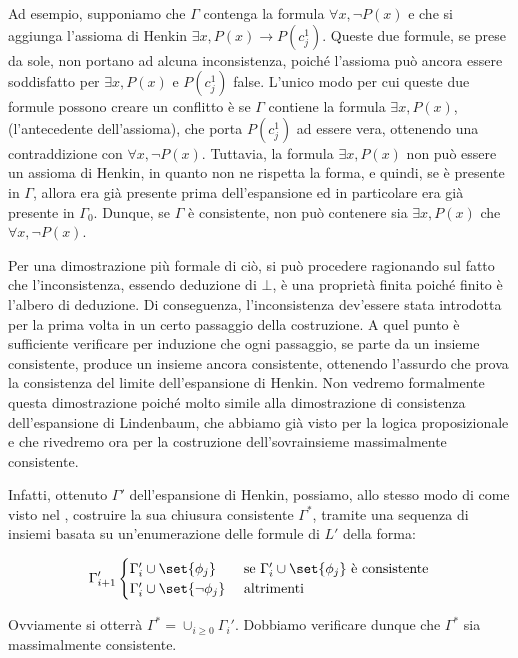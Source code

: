 Ad esempio, supponiamo che \(\Gamma\) contenga la formula \(\forall x, \neg P(x)\) e che si aggiunga l'assioma di Henkin \(\exists x, P(x) \to P(c_j^1)\). Queste due formule, se prese da sole, non portano ad alcuna inconsistenza, poiché l'assioma può ancora essere soddisfatto per \(\exists x, P(x)\) e \(P(c_j^1)\) false. L'unico modo per cui queste due formule possono creare un conflitto è se \(\Gamma\) contiene la formula \(\exists x, P(x)\), (l'antecedente dell'assioma), che porta \(P(c_j^1)\) ad essere vera, ottenendo una contraddizione con \(\forall x, \neg P(x)\).
Tuttavia, la formula \(\exists x, P(x)\) non può essere un assioma di Henkin, in quanto non ne rispetta la forma, e quindi, se è presente in \(\Gamma\), allora era già presente prima dell'espansione ed in particolare era già presente in \(\Gamma_0\). Dunque, se \(\Gamma\) è consistente, non può contenere sia \(\exists x, P(x)\) che \(\forall x, \neg P(x)\).

Per una dimostrazione più formale di ciò, si può procedere ragionando sul fatto che l'inconsistenza, essendo deduzione di \(\bot\), è una proprietà finita poiché finito è l'albero di deduzione. Di conseguenza, l'inconsistenza dev'essere stata introdotta per la prima volta in un certo passaggio della costruzione. A quel punto è sufficiente verificare per induzione che ogni passaggio, se parte da un insieme consistente, produce un insieme ancora consistente, ottenendo l'assurdo che prova la consistenza del limite dell'espansione di Henkin. Non vedremo formalmente questa dimostrazione poiché molto simile alla dimostrazione di consistenza dell'espansione di Lindenbaum, che abbiamo già visto per la logica proposizionale e che rivedremo ora per la costruzione dell'sovrainsieme massimalmente consistente.

Infatti, ottenuto \(\Gamma'\) dell'espansione di Henkin, possiamo, allo stesso modo di come visto nel , costruire la sua chiusura consistente \(\Gamma^*\), tramite una sequenza di insiemi basata su un'enumerazione delle formule di \(L'\) della forma:

\[\Gamma_{i+1}' \begin{cases}
                  \Gamma_i' \cup \set{\phi_j} & \text{ se } \Gamma_i' \cup \set{\phi_j} \text{ è consistente}\\
                  \Gamma_i' \cup \set{\neg \phi_j} & \text{ altrimenti}
                \end{cases}
\]

Ovviamente si otterrà \(\Gamma^* = \cup_{i\geq 0} \Gamma_i'\). Dobbiamo verificare dunque che \(\Gamma^*\) sia massimalmente consistente.

